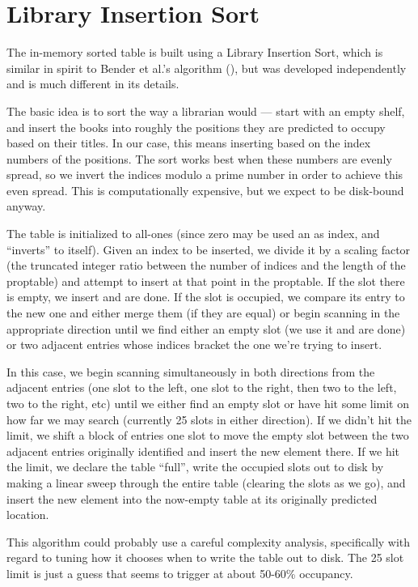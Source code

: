 \documentclass[11pt]{article}
\begin{document}
\section{Library Insertion Sort}

The in-memory sorted table is built using a Library Insertion Sort,
which is similar in spirit to Bender et al.'s algorithm
(\cite{bender}), but was developed independently and is much different
in its details.

The basic idea is to sort the way a librarian would --- start with an
empty shelf, and insert the books into roughly the positions they are
predicted to occupy based on their titles.  In our case, this means
inserting based on the index numbers of the positions.  The sort works
best when these numbers are evenly spread, so we invert the indices
modulo a prime number in order to achieve this even spread.  This is
computationally expensive, but we expect to be disk-bound anyway.

The table is initialized to all-ones (since zero may be used an as
index, and ``inverts'' to itself).  Given an index to be inserted, we
divide it by a scaling factor (the truncated integer ratio between the
number of indices and the length of the proptable) and attempt to
insert at that point in the proptable.  If the slot there is empty, we
insert and are done.  If the slot is occupied, we compare its entry to
the new one and either merge them (if they are equal) or begin
scanning in the appropriate direction until we find either an empty
slot (we use it and are done) or two adjacent entries whose indices
bracket the one we're trying to insert.

In this case, we begin scanning simultaneously in both directions from
the adjacent entries (one slot to the left, one slot to the right,
then two to the left, two to the right, etc) until we either find an
empty slot or have hit some limit on how far we may search (currently
25 slots in either direction).  If we didn't hit the limit, we shift a
block of entries one slot to move the empty slot between the two
adjacent entries originally identified and insert the new element
there.  If we hit the limit, we declare the table ``full'', write the
occupied slots out to disk by making a linear sweep through the entire
table (clearing the slots as we go), and insert the new element
into the now-empty table at its originally predicted location.

This algorithm could probably use a careful complexity analysis,
specifically with regard to tuning how it chooses when to write the
table out to disk.  The 25 slot limit is just a guess that seems
to trigger at about 50-60\% occupancy.
\end{document}
